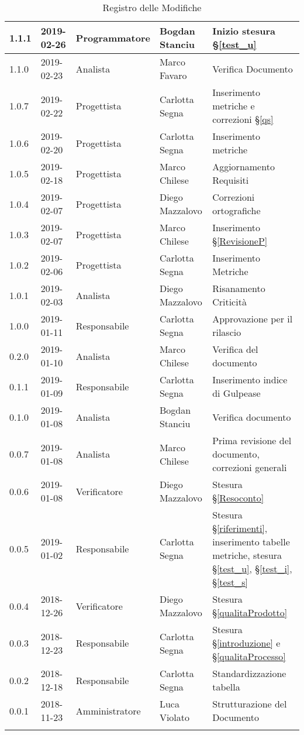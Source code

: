\begin{center}
\begin{longtable}[c]{|m{}|m{}|m{}|m{}|p{}|}
\hline
\rowcolor{grigio}1.1.1 & 2019-02-26 & Programmatore & Bogdan Stanciu & Inizio stesura §\ref{test_u} \\
\hline
1.1.0 & 2019-02-23 & Analista & Marco Favaro & Verifica Documento\\
\hline
\rowcolor{grigio} 1.0.7 & 2019-02-22 & Progettista & Carlotta Segna & Inserimento metriche e correzioni §\ref{qs}\\
\hline
1.0.6 & 2019-02-20 & Progettista & Carlotta Segna & Inserimento metriche\\
\hline
\rowcolor{grigio} 1.0.5 & 2019-02-18 & Progettista & Marco Chilese & Aggiornamento  Requisiti\\
\hline
1.0.4 & 2019-02-07 & Progettista & Diego Mazzalovo & Correzioni ortografiche \\
\hline
\rowcolor{grigio} 1.0.3 & 2019-02-07 & Progettista & Marco Chilese & Inserimento §\ref{RevisioneP} \\
\hline
1.0.2 & 2019-02-06 & Progettista & Carlotta Segna & Inserimento Metriche \\
\hline
\rowcolor{grigio}1.0.1 & 2019-02-03 & Analista & Diego Mazzalovo & Risanamento Criticità \\
\hline 
1.0.0 & 2019-01-11 & Responsabile & Carlotta Segna & Approvazione per il rilascio\\
\hline
\rowcolor{grigio}0.2.0 & 2019-01-10 & Analista & Marco Chilese & Verifica del documento\\
\hline
0.1.1 & 2019-01-09 & Responsabile & Carlotta Segna & Inserimento indice di Gulpease \\
\hline
\rowcolor{grigio}0.1.0 & 2019-01-08 &  Analista & Bogdan Stanciu & Verifica documento \\
\hline
0.0.7 & 2019-01-08 & Analista & Marco Chilese & Prima revisione del documento, correzioni generali\\
\hline
\rowcolor{grigio}0.0.6 & 2019-01-08 & Verificatore & Diego Mazzalovo & Stesura §\ref{Resoconto}\\
\hline
0.0.5 & 2019-01-02 & Responsabile & Carlotta Segna & Stesura §\ref{riferimenti}, inserimento tabelle metriche, stesura §\ref{test_u}, §\ref{test_i}, §\ref{test_s} \\
\hline
\rowcolor{grigio} 0.0.4 & 2018-12-26 & Verificatore & Diego Mazzalovo  & Stesura §\ref{qualitaProdotto} \\
\hline
0.0.3 & 2018-12-23 & Responsabile  & Carlotta Segna & Stesura §\ref{introduzione} e §\ref{qualitaProcesso} \\
\hline
\rowcolor{grigio} 0.0.2 & 2018-12-18 & Responsabile & Carlotta Segna & Standardizzazione tabella \\
\hline
0.0.1 & 2018-11-23 & Amministratore & Luca Violato & Strutturazione del Documento \\

\hline
\caption{Registro delle Modifiche}
\end{longtable}
\end{center}
